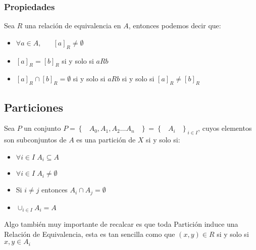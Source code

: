 \documentclass[12pt, fleqn]{report}                             %
\DeclareMathOperator \Space {\quad}                             %
\DeclareMathOperator \MiniSpace {\;}                            %
\newcommand{\Set}[1]{\left\{ \MiniSpace #1 \MiniSpace \right\}} %
\begin{document}
                    \subsubsection{Propiedades}

                    Sea $R$ una relación de equivalencia en $A$, entonces podemos decir que:
                    \begin{itemize}

                        \item $\forall a \in A, \Space [a]_R \neq \emptyset$

                        \item $[a]_R = [b]_R$ si y solo si $a R b$

                        \item $[a]_R \cap [b]_R = \emptyset$ si y solo si $a R b$ si y solo si
                            $[a]_R \neq [b]_R$

                    \end{itemize}


            \clearpage
            \subsection{Particiones}

                Sea $P$ un conjunto $P = \Set{A_0, A_1, A_2 \dots A_n} = \Set{A_i}_{i \in I}$, 
                cuyos elementos son subconjuntos de $A$ es una partición de $X$ si y solo si:

                \begin{itemize}
                    \item $\forall i \in I \; A_i \subseteq A$

                    \item $\forall i \in I \; A_i \neq \emptyset$

                    \item Si $i \neq j$ entonces $A_i \cap A_j = \emptyset$

                    \item $\cup_{i \in I} A_i = A$
                \end{itemize}


                Algo también muy importante de recalcar es que toda Partición induce una Relación de
                Equivalencia, esta es tan sencilla como que $(x,y) \in R$ si y solo si $x, y \in A_i$
\end{document}
